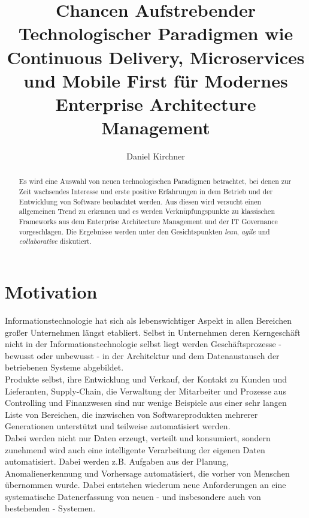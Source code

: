 \documentclass{llncs}
\begin{document}
\title{Chancen Aufstrebender Technologischer Paradigmen wie Continuous Delivery, Microservices und Mobile First für Modernes Enterprise Architecture Management}
\author{Daniel Kirchner}
\maketitle
%
\begin{abstract}
Es wird eine Auswahl von neuen technologischen Paradigmen betrachtet, bei denen zur Zeit wachsendes Interesse und erste positive Erfahrungen in dem Betrieb und der Entwicklung von Software beobachtet werden.
Aus diesen wird versucht einen allgemeinen Trend zu erkennen und es werden Verknüpfungspunkte zu klassischen Frameworks aus dem Enterprise Architecture Management und der IT Governance vorgeschlagen.
Die Ergebnisse werden unter den Gesichtspunkten \textit{lean}, \textit{agile} und \textit{collaborative} diskutiert.
\end{abstract}
%
\section{Motivation}
%
Informationstechnologie hat sich als lebenswichtiger Aspekt in allen Bereichen großer Unternehmen längst etabliert. Selbst in Unternehmen deren Kerngeschäft nicht in der Informationstechnologie selbst liegt werden Geschäftsprozesse - bewusst oder unbewusst - in der Architektur und dem Datenaustausch der betriebenen Systeme abgebildet.\\

Produkte selbst, ihre Entwicklung und Verkauf, der Kontakt zu Kunden und Lieferanten, Supply-Chain, die Verwaltung der Mitarbeiter und Prozesse aus Controlling und Finanzwesen sind nur wenige Beispiele aus einer sehr langen Liste von Bereichen, die inzwischen von Softwareprodukten mehrerer Generationen unterstützt und teilweise automatisiert werden.\\

Dabei werden nicht nur Daten erzeugt, verteilt und konsumiert, sondern zunehmend wird auch eine intelligente Verarbeitung der eigenen Daten automatisiert. Dabei werden z.B. Aufgaben aus der Planung, Anomalienerkennung und Vorhersage automatisiert, die vorher von Menschen übernommen wurde. Dabei entstehen wiederum neue Anforderungen an eine systematische Datenerfassung von neuen - und insbesondere auch von bestehenden - Systemen.\\
\end{document}
